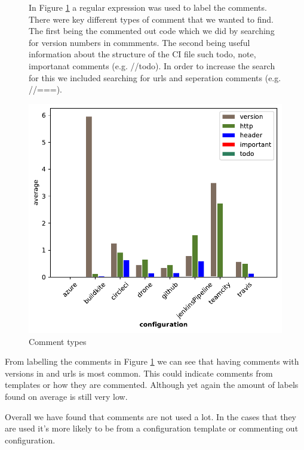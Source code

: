 \documentclass[twoside,12pt,titlepage,a4paper]{article}
\begin{document}
\begin{figure}[!ht]
  \centering
  \begin{minipage}[!t]{.48\textwidth}
    In Figure \ref{fig:comment_types} a regular expression was used to label the comments. There were key different types of comment that we wanted to find. The first being the commented out code which we did by searching for version numbers in commments. The second being useful information about the structure of the CI file such todo, note, importanat comments (e.g. //todo). In order to increase the search for this we included searching for urls and seperation comments (e.g. //===).
    
  \end{minipage}%
  \hfill
  \begin{minipage}[!t]{.48\textwidth}
    \includegraphics[width=\textwidth]{../src/results/comments usage bars.pdf}
    \caption[alt text]{Comment types}
    \label{fig:comment_types}  
  \end{minipage}
\end{figure}

From labelling the comments in Figure \ref{fig:comment_types} we can see that having comments with versions in and urls is most common. This could indicate comments from templates or how they are commented. Although yet again the amount of labels found on average is still very low.

Overall we have found that comments are not used a lot. In the cases that they are used it's more likely to be from a configuration template or commenting out configuration.
\end{document}
